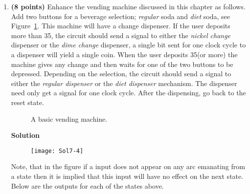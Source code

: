 \begin{enumerate}
\begin{onlysolution}
{                The cost of this solution is 6*8 + 6 + 2 + 9 + 6 + 6 + 9 + 6 + 2 + 5 = 48 + 51 = 99
            }
        \end{onlysolution}

    \item \textbf{ (8 points)}
        Enhance the vending machine discussed in this chapter as follows.
        Add two buttons for a beverage selection; \textit{ regular} soda and \textit{ diet}
        soda, see Figure~\ref{fig:Vend}.  This machine will have a change dispenser.
        If the user deposits more than 35\textcent, the circuit should send a signal to
        either the \textit{ nickel change} dispenser or the \textit{ dime change} dispenser,
        a single bit sent for one clock cycle to a dispenser will yield a single coin.
        When the user deposits 35\textcent (or more) the machine gives any change and
        then waits for one of the two buttons to be depressed.  Depending on the
        selection, the circuit should send a signal to either the
        \textit{ regular dispenser} or
        the \textit{ diet dispenser} mechanism.  The dispenser need only get a signal for
        one clock cycle.  After the dispensing, go back to the reset state.
        \begin{figure}[ht]
            \caption{A basic vending machine.}
            \label{fig:Vend}
        \end{figure}\vspace{-1em}
        \begin{onlysolution}  \textbf{Solution} \itshape{
                \begin{figure}[ht]
                    \texttt{[image: Sol7-4]}
                \end{figure}

                Note, that in the figure if a input does not appear on
                any arc emanating from a state then it is implied that
                this input will have no effect on the next state.  Below
                are the outputs for each of the states above.

}
\end{onlysolution}
\end{enumerate}
